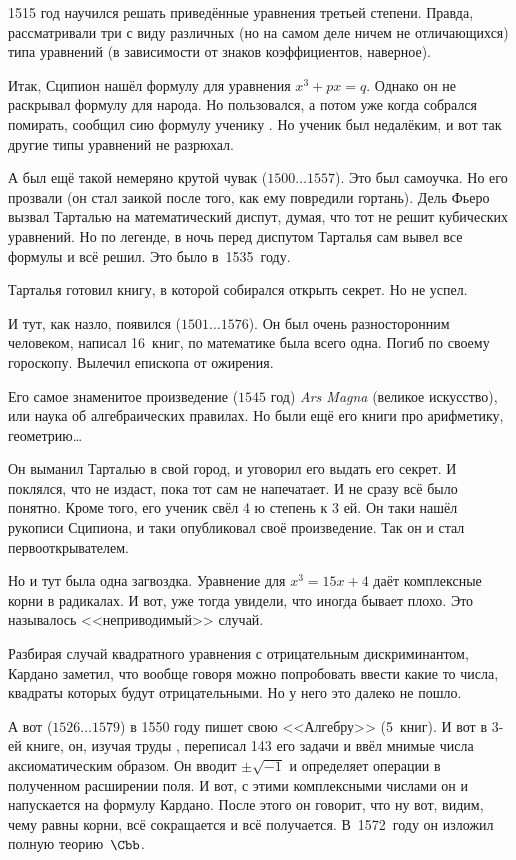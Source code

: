 \documentclass[a4paper,oneside,fleqn,10pt]{article}
\newcommand{\pe}[2]{${#1}\ldots{#2}$}
\begin{document}
1515 год  научился решать приведённые уравнения третьей степени.
Правда, рассматривали три с виду различных (но на самом деле ничем не отличающихся) типа
уравнений (в зависимости от знаков коэффициентов, наверное).

Итак, Сципион нашёл формулу для уравнения $x^3 + px = q$. Однако он не раскрывал формулу для народа.
Но пользовался, а потом уже когда собрался помирать, сообщил сию формулу ученику .
Но ученик был недалёким, и вот так другие типы уравнений не разрюхал.

А был ещё такой немеряно крутой чувак  (\pe{1500}{1557}). Это был самоучка.
Но его прозвали  (он стал заикой после того, как ему повредили гортань).
Дель Фьеро вызвал Тарталью на математический диспут, думая, что тот не решит кубических уравнений.
Но по легенде, в ночь перед диспутом Тарталья сам вывел все формулы и всё решил.
Это было в~1535~году.

Тарталья готовил книгу, в которой собирался открыть секрет. Но не успел.

И тут, как назло, появился  (\pe{1501}{1576}). Он был очень разносторонним человеком,
написал 16~книг, по математике была всего одна. Погиб по своему гороскопу.
Вылечил епископа от ожирения.

Его самое знаменитое произведение ($1545$ год) \emph{Ars Magna} (великое искусство),
или наука об алгебраических правилах. Но были ещё его книги про арифметику, геометрию\ldots

Он выманил Тарталью в свой город, и уговорил его выдать его секрет. И поклялся,
что не издаст, пока тот сам не напечатает. И не сразу всё было понятно.
Кроме того, его ученик 
свёл 4 ю степень к 3 ей. Он таки нашёл рукописи Сципиона, и
таки опубликовал своё произведение. Так он и стал первооткрывателем.

Но и тут была одна загвоздка. Уравнение для $x^3 = 15x + 4$ даёт комплексные корни в радикалах.
И вот, уже тогда увидели, что иногда бывает плохо. Это называлось <<неприводимый>> случай.

Разбирая случай квадратного уравнения
с отрицательным дискриминантом, Кардано заметил, что вообще говоря можно
попробовать ввести какие то числа, квадраты которых будут отрицательными.
Но у него это далеко не пошло.

А вот
 (\pe{1526}{1579}) в 1550 году пишет свою <<Алгебру>> (5~книг).
И вот в 3-ей книге, он, изучая труды , переписал 143 его задачи
и ввёл мнимые числа аксиоматическим образом. Он вводит $\pm\sqrt{-1}$ и определяет операции
в полученном расширении поля. И вот, с этими комплексными числами он и напускается
на формулу Кардано. После этого он говорит, что ну вот, видим, чему равны корни,
всё сокращается и всё получается. В~1572~году он изложил полную теорию~$\Cbb$.
\end{document}
